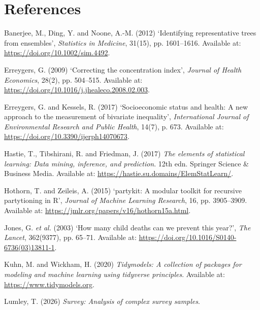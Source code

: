 \documentclass[
  11pt,
  a4paper,
]{article}
\newlength{\cslhangindent}
\newenvironment{CSLReferences}[2] %
 {\begin{list}{}{%
  \setlength{\itemindent}{0pt}
  \setlength{\leftmargin}{0pt}
  \setlength{\parsep}{0pt}
  \ifodd #1
   \setlength{\leftmargin}{\cslhangindent}
   \setlength{\itemindent}{-1\cslhangindent}
  \fi
  \setlength{\itemsep}{#2\baselineskip}}}
 {\end{list}}
\begin{document}
\section{References}\label{sec-references}

\protect{}\label{refs}
\begin{CSLReferences}{0}{1}
Banerjee, M., Ding, Y. and Noone, A.-M. (2012) {`Identifying
representative trees from ensembles'}, \emph{Statistics in Medicine},
31(15), pp. 1601--1616. Available at:
\url{https://doi.org/10.1002/sim.4492}.

Erreygers, G. (2009) {`Correcting the concentration index'},
\emph{Journal of Health Economics}, 28(2), pp. 504--515. Available at:
\url{https://doi.org/10.1016/j.jhealeco.2008.02.003}.

Erreygers, G. and Kessels, R. (2017) {`Socioeconomic status and health:
A new approach to the measurement of bivariate inequality'},
\emph{International Journal of Environmental Research and Public
Health}, 14(7), p. 673. Available at:
\url{https://doi.org/10.3390/ijerph14070673}.

Hastie, T., Tibshirani, R. and Friedman, J. (2017) \emph{The elements of
statistical learning: Data mining, inference, and prediction}. 12th edn.
Springer Science \& Business Media. Available at:
\url{https://hastie.su.domains/ElemStatLearn/}.

Hothorn, T. and Zeileis, A. (2015) {`{partykit}: A modular toolkit for
recursive partytioning in {R}'}, \emph{Journal of Machine Learning
Research}, 16, pp. 3905--3909. Available at:
\url{https://jmlr.org/papers/v16/hothorn15a.html}.

Jones, G. \emph{et al.} (2003) {`How many child deaths can we prevent
this year?'}, \emph{The Lancet}, 362(9377), pp. 65--71. Available at:
\url{https://doi.org/10.1016/S0140-6736(03)13811-1}.

Kuhn, M. and Wickham, H. (2020) \emph{Tidymodels: A collection of
packages for modeling and machine learning using tidyverse principles}.
Available at: \url{https://www.tidymodels.org}.

Lumley, T. (2026) \emph{Survey: Analysis of complex survey samples}.


\end{CSLReferences}
\end{document}
